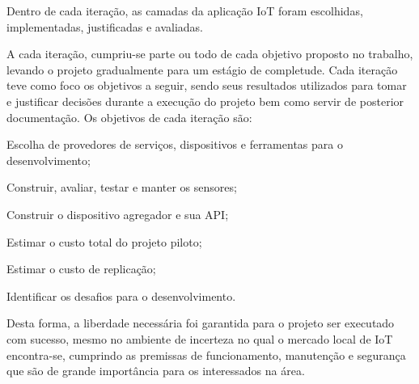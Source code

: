 Dentro de cada iteração, as camadas da aplicação IoT foram escolhidas,
implementadas, justificadas e avaliadas.

A cada iteração, cumpriu-se parte ou todo de cada objetivo proposto no trabalho,
levando o projeto gradualmente para um estágio de completude.
Cada iteração teve como foco os objetivos a seguir, sendo seus resultados
utilizados para tomar e justificar decisões durante a execução do
projeto bem como servir de posterior documentação. Os objetivos de cada iteração
são:

\begin{alineas}

	\item Escolha de provedores de serviços, dispositivos e ferramentas para o
desenvolvimento;

	\item Construir, avaliar, testar e manter os sensores;

	\item Construir o dispositivo agregador e sua API;

	\item Estimar o custo total do projeto piloto;

	\item Estimar o custo de replicação;

	\item Identificar os desafios para o desenvolvimento.

\end{alineas}

Desta forma, a liberdade necessária foi garantida para o projeto ser
executado com sucesso, mesmo no ambiente de incerteza no qual o mercado local de
IoT encontra-se, cumprindo as premissas de funcionamento, manutenção e
segurança que são de grande importância para os interessados na área.
